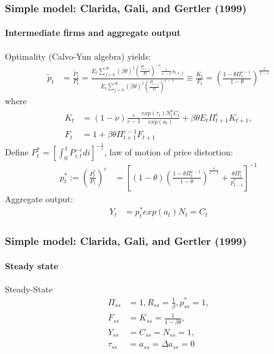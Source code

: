 \documentclass[handout]{beamer}  %
\begin{document}
\begin{frame}
\frametitle{Simple model: Clarida, Gali, and Gertler (1999)}\framesubtitle{Intermediate firms and aggregate output}\footnotesize
Optimality (Calvo-Yun algebra) yields:
\begin{align}
  \tilde{p}_t &= \frac{\tilde{P}_t}{P_t} = \frac{E_t \sum_{j=0}^\infty (\beta \theta)^j \left(\frac{P_{t+j}}{P_t}\right)^{-\varepsilon} \frac{\varepsilon}{\varepsilon-1} s_{t+j}}{E_t \sum_{j=0}^\infty (\beta \theta)^j \left(\frac{P_{t+j}}{P_t}\right)^{\varepsilon-1}} \equiv \frac{K_t}{F_t} = \left(\frac{1-\theta \Pi_t^{\varepsilon-1}}{1-\theta}\right)^\frac{1}{1-\varepsilon}
\end{align}
where
\begin{align}
  K_t &= (1-\nu) \frac{\varepsilon}{\varepsilon-1} \frac{exp(\tau_t)N_t^\phi C_t}{exp(a_t)} + \beta \theta E_t \Pi_{t+1}^\varepsilon K_{t+1},\\
  F_t &= 1+ \beta \theta \Pi_{t+1} ^{\varepsilon-1} F_{t+1}
\end{align}
Define $P_t^* = \left[\int_0^1 P_{i,t}^{-\varepsilon}di\right]^{-\frac{1}{\varepsilon}}$, law of motion of price distortion:
\begin{align}
  p_t^* := \left(\frac{P_t^*}{P_t} \right)^\varepsilon&= \left[(1-\theta)\left(\frac{1-\theta \Pi_t^{\varepsilon-1}}{1-\theta}\right)^\frac{\varepsilon}{\varepsilon-1} + \frac{\theta \Pi_t^\varepsilon}{p_{t-1}^*}\right]^{-1}
\end{align}
Aggregate output:
\begin{align}
    Y_t &= p_t^* exp(a_t) N_t = C_t
\end{align}
\end{frame}

\begin{frame}\frametitle{Simple model: Clarida, Gali, and Gertler (1999)}\framesubtitle{Steady state}
  \begin{block}{Steady-State}
    \begin{align*}
      \Pi_{ss} &= 1, R_{ss}=\frac{1}{\beta}, p^*_{ss} = 1,\\
      F_{ss}&=K_{ss}=\frac{1}{1-\beta \theta},\\
      Y_{ss}&=C_{ss}=N_{ss} = 1,\\
      \tau_{ss}&=a_{ss}=\Delta a_{ss}=0
    \end{align*}
  \end{block}
\end{frame}
\end{document}
